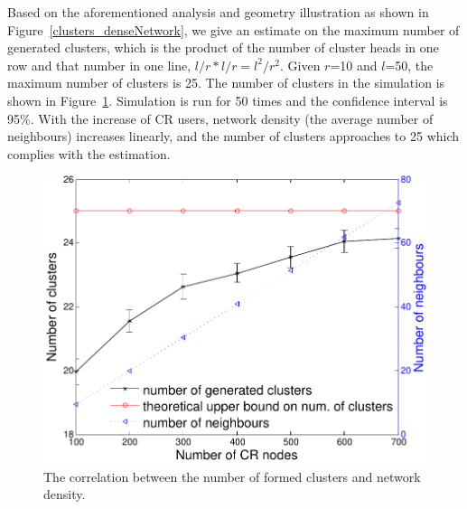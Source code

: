 \documentclass[10pt,journal,compsoc]{IEEEtran}
\theoremstyle{mytheoremstyle}
\theoremstyle{mytheoremstyle}
\theoremstyle{mytheoremstyle}
\begin{document}
Based on the aforementioned analysis and geometry illustration as shown in Figure~\ref{clusters_denseNetwork}, we give an estimate on the maximum number of generated clusters, which is the product of the number of cluster heads in one row and that number in one line, $l/r * l/r = l^2/r^2$.
Given $r$=10 and $l$=50, the maximum number of clusters is 25.
The number of clusters in the simulation is shown in Figure~\ref{number_clusters_scale}.
Simulation is run for 50 times and the confidence interval is 95\%.
With the increase of CR users, network density (the average number of neighbours) increases linearly, and the number of clusters approaches to 25 which complies with the estimation.

\begin{figure}[h]
  \centering
  \includegraphics[width=0.7\linewidth]{number_clusters_upperBound.pdf}
  \caption{The correlation between the number of formed clusters and network density.}
  \label{number_clusters_scale}
\end{figure}
\end{document}
